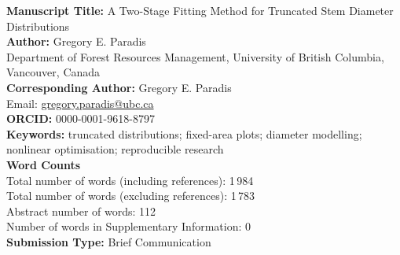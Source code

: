 \documentclass[12pt]{article}
\begin{document}
\thispagestyle{empty}
\doublespacing

\textbf{Manuscript Title:} A Two-Stage Fitting Method for Truncated Stem Diameter Distributions\\[1ex]
\textbf{Author:} Gregory E. Paradis\\
Department of Forest Resources Management, University of British Columbia, Vancouver, Canada\\[1ex]
\textbf{Corresponding Author:} Gregory E. Paradis\\
Email: \href{mailto:gregory.paradis@ubc.ca}{gregory.paradis@ubc.ca}\\[1ex]
\textbf{ORCID:} 0000-0001-9618-8797\\[1ex]
\textbf{Keywords:} truncated distributions; fixed-area plots; diameter modelling; nonlinear optimisation; reproducible research\\[1ex]
\textbf{Word Counts}\\
Total number of words (including references): 1\,984\\
Total number of words (excluding references): 1\,783\\
Abstract number of words: 112\\
Number of words in Supplementary Information: 0\\[1ex]
\textbf{Submission Type:} Brief Communication\\
\end{document}
